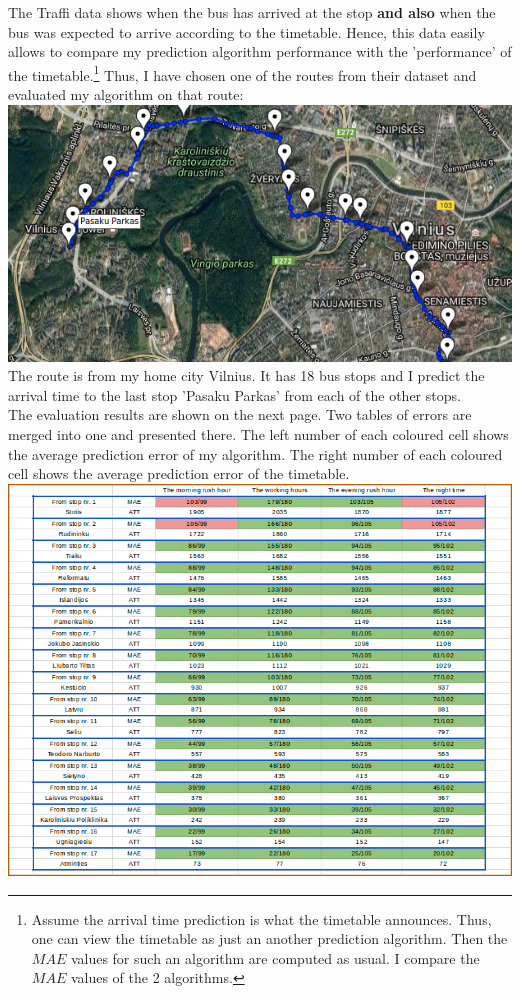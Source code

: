 \documentclass[12pt,a4paper,oneside,openright]{report}
\begin{document}
The Traffi data shows when the
bus has arrived at the stop \textbf{and also} when the bus was expected to arrive
according to the timetable. Hence, this data easily allows to compare my prediction
algorithm performance with the 'performance' of the timetable.\footnote{Assume the
arrival time prediction is what the timetable announces. Thus, one can view the
timetable as just an another prediction algorithm. Then the $MAE$ values for such an
algorithm are computed as usual. I compare the $MAE$ values of the 2 algorithms.} Thus,
I have chosen one of the routes from their dataset and evaluated my algorithm
on that route: \\

\includegraphics[width=\textwidth]{figs/vilnius_route.png} \\

The route is from my home city Vilnius. It has 18 bus stops and
I predict the arrival time to the last stop 'Pasaku Parkas' from each
of the other stops. \\

The evaluation results are shown on the next page. Two tables of errors are merged
into one and presented there. The left number of each coloured cell shows the
average prediction error of my algorithm. The right number of each coloured cell
shows the average prediction error of the timetable. \\

\includegraphics[width=\textwidth]{figs/table_of_vilnius.png} \\
\end{document}
